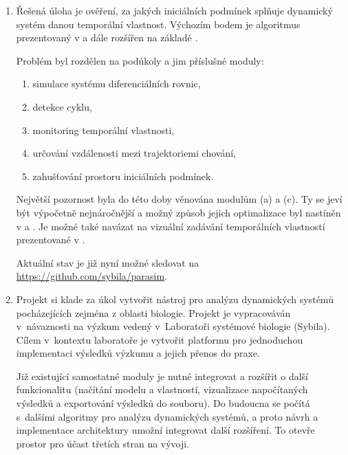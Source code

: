 \documentclass[a4paper]{article}
\begin{document}
\begin{enumerate}

\item   Řešená úloha je ověření, za jakých iniciálních podmínek splňuje
        dynamický systém danou temporální vlastnost. Výchozím bodem je algoritmus
        prezentovaný v \cite{drazan_master} a dále rozšířen na základě \cite{robustness}.

        Problém byl rozdělen na podúkoly a jim příslušné moduly:
        \begin{enumerate}
            \item   simulace systému diferenciálních rovnic,
            \item   detekce cyklu,
            \item   monitoring temporální vlastnosti,
            \item   určování vzdálenosti mezi trajektoriemi chování,
            \item   zahušťování prostoru iniciálních podmínek.
        \end{enumerate}

        Největší pozornost byla do této doby věnována modulům (a) a (c). Ty se jeví
        být výpočetně nejnáročnější a možný způsob jejich optimalizace byl nastíněn
        v \cite{papousek_bachelor} a \cite{kovacik_bachelor}. Je možné také navázat
        na vizuální zadávání temporálních vlastností prezentované v \cite{vejpustek_bachelor}.
        
        Aktuální stav je již nyní možné sledovat na \url{https://github.com/sybila/parasim}.

\item   Projekt si klade za úkol vytvořit nástroj pro analýzu dynamických systémů
        pocházejících zejména z oblasti biologie. Projekt je vypracováván v~návaznosti
        na výzkum vedený v~Laboratoři systémové biologie (Sybila). Cílem v~kontextu
        laboratoře je vytvořit platformu pro jednoduchou implementaci výsledků
        výzkumu a jejich přenos do praxe.

        Již existující samostatné moduly je nutné integrovat a rozšířit o další
        funkcionalitu (načítání modelu a vlastností, vizualizace napočítaných
        výsledků a exportování výsledků do souboru). Do budoucna se počítá s~dalšími
        algoritmy pro analýzu dynamických systémů, a proto návrh a implementace
        architektury umožní integrovat další rozšíření. To otevře prostor pro účast
        třetích stran na vývoji.


\end{enumerate}
\end{document}
